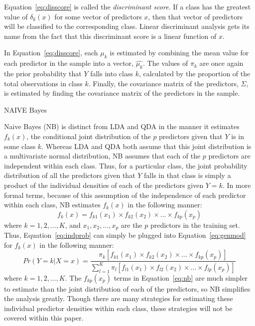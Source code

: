 \documentclass[12pt]{article}
\begin{document}
Equation~\eqref{eq:disscore} is called the \textit{discriminant score}.  If a class 
has the greatest value of $\delta_k(x)$ for some vector of predictors $x$, then that 
vector of predictors will be classified to the corresponding class. Linear 
discriminant analysis gets its name from the fact that this discriminant score is a 
linear function of $x$. 

In Equation~\eqref{eq:disscore}, each $\mu_k$ is estimated by combining the mean value 
for each predictor in the sample into a vector, $\hat{\mu_k}$.  The values of $\pi_k$ 
are once again the prior probability that $Y$ falls into class $k$, calculated by the 
proportion of the total observations in class $k$.  Finally, the covariance matrix of 
the predictors, $\Sigma$, is estimated by finding the covariance matrix of the 
predictors in the sample. 

NAIVE Bayes

Naive Bayes (NB) is distinct from LDA and QDA in the manner it estimates $f_k(x)$, 
the conditional joint distribution of the $p$ predictors given that $Y$ is in some 
class $k$.  Whereas LDA and QDA both assume that this joint distribution is a multivariate 
normal distribution, NB assumes that each of the $p$ predictors are independent within each 
class.  Thus, for a particular class, the joint probability distribution of all the 
predictors given that $Y$ falls in that class is simply a product of the individual densities 
of each of the predictors given $Y = k$.  In more formal terms, because of this assumption of 
the independence of each predictor within each class, NB estimates $f_k(x)$ in the following 
manner:
\begin{equation}
  \label{eq:indprob}
  f_k(x) = f_{k1}(x_1) \times f_{k2}(x_2) \times ... \times f_{kp}(x_p)
\end{equation} 
where $k = 1, 2, ..., K$, and $x_1, x_2, ..., x_p$ are the $p$ predictors in the training set.  
Thus, Equation~\eqref{eq:indprob} can simply be plugged into Equation~\eqref{eq:genmod} for 
$f_k(x)$ in the following manner:
\begin{equation}
  \label{eq:nb}
   Pr(Y = k | X = x) =
  \frac{\pi_k [f_{k1}(x_1) \times f_{k2}(x_2) \times ... \times f_{kp}(x_p)]} 
  {\sum_{l = 1} ^ {K} \pi_l [f_{l1}(x_1) \times f_{l2}(x_2) \times ... \times f_{lp}(x_p)]}
\end{equation} 
where $k = 1, 2, ..., K$.  The $f_{kp}(x_p)$ terms in Equation~\eqref{eq:nb} are much simpler 
to estimate than the joint distribution of each of the predictors, so NB simplifies the 
analysis greatly.  Though there are many strategies for estimating these individual predictor 
densities within each class, these strategies will not be covered within this paper.  
\end{document}
